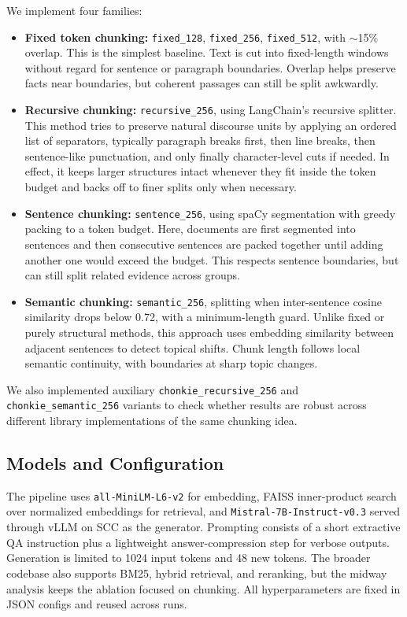 \documentclass[11pt]{article}
\begin{document}
We implement four families:
\begin{itemize}
  \item \textbf{Fixed token chunking:} \texttt{fixed\_128}, \texttt{fixed\_256}, \texttt{fixed\_512}, with $\sim$15\% overlap. This is the simplest baseline. Text is cut into fixed-length windows without regard for sentence or paragraph boundaries. Overlap helps preserve facts near boundaries, but coherent passages can still be split awkwardly.
  \item \textbf{Recursive chunking:} \texttt{recursive\_256}, using LangChain's recursive splitter. This method tries to preserve natural discourse units by applying an ordered list of separators, typically paragraph breaks first, then line breaks, then sentence-like punctuation, and only finally character-level cuts if needed. In effect, it keeps larger structures intact whenever they fit inside the token budget and backs off to finer splits only when necessary. 
  \item \textbf{Sentence chunking:} \texttt{sentence\_256}, using spaCy segmentation with greedy packing to a token budget. Here, documents are first segmented into sentences and then consecutive sentences are packed together until adding another one would exceed the budget. This respects sentence boundaries, but can still split related evidence across groups.
  \item \textbf{Semantic chunking:} \texttt{semantic\_256}, splitting when inter-sentence cosine similarity drops below 0.72, with a minimum-length guard. Unlike fixed or purely structural methods, this approach uses embedding similarity between adjacent sentences to detect topical shifts. Chunk length follows local semantic continuity, with boundaries at sharp topic changes.
\end{itemize}

We also implemented auxiliary \texttt{chonkie\_recursive\_256} and \texttt{chonkie\_semantic\_256} variants to check whether results are robust across different library implementations of the same chunking idea.

\subsection{Models and Configuration}

The pipeline uses \texttt{all-MiniLM-L6-v2} for embedding, FAISS inner-product search over normalized embeddings for retrieval, and \texttt{Mistral-7B-Instruct-v0.3} served through vLLM on SCC as the generator. Prompting consists of a short extractive QA instruction plus a lightweight answer-compression step for verbose outputs. Generation is limited to 1024 input tokens and 48 new tokens. The broader codebase also supports BM25, hybrid retrieval, and reranking, but the midway analysis keeps the ablation focused on chunking. All hyperparameters are fixed in JSON configs and reused across runs.
\end{document}
